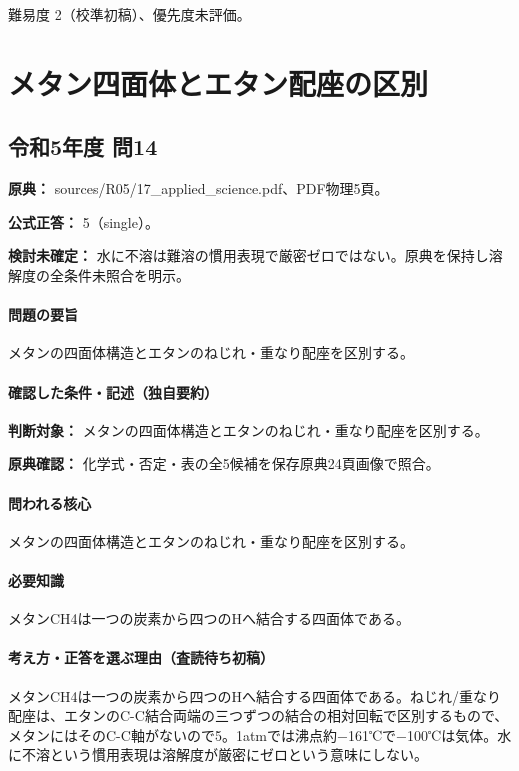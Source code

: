 \par 難易度 2（校準初稿）、優先度未評価。

\section{メタン四面体とエタン配座の区別}

\subsection{令和5年度 問14}
\label{q:r05-reg-applied-14}

\noindent\textbf{原典：} sources/R05/17\_applied\_science.pdf、PDF物理5頁。

\textbf{公式正答：} 5（single）。

\par\textbf{検討未確定：} 水に不溶は難溶の慣用表現で厳密ゼロではない。原典を保持し溶解度の全条件未照合を明示。

\paragraph{問題の要旨} メタンの四面体構造とエタンのねじれ・重なり配座を区別する。

\paragraph{確認した条件・記述（独自要約）}\mbox{}\par

\noindent\textbf{判断対象：} メタンの四面体構造とエタンのねじれ・重なり配座を区別する。\par

\noindent\textbf{原典確認：} 化学式・否定・表の全5候補を保存原典24頁画像で照合。\par

\paragraph{問われる核心} メタンの四面体構造とエタンのねじれ・重なり配座を区別する。

\paragraph{必要知識} メタンCH4は一つの炭素から四つのHへ結合する四面体である。

\paragraph{考え方・正答を選ぶ理由（査読待ち初稿）} メタンCH4は一つの炭素から四つのHへ結合する四面体である。ねじれ/重なり配座は、エタンのC-C結合両端の三つずつの結合の相対回転で区別するもので、メタンにはそのC-C軸がないので5。1atmでは沸点約−161℃で−100℃は気体。水に不溶という慣用表現は溶解度が厳密にゼロという意味にしない。

